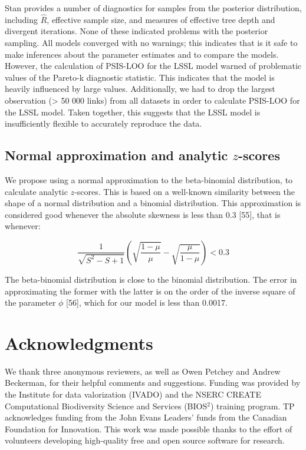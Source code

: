\documentclass[12pt]{article}
\begin{document}
Stan provides a number of diagnostics for samples from the posterior
distribution, including \(\hat{R}\), effective sample size, and measures
of effective tree depth and divergent iterations. None of these
indicated problems with the posterior sampling. All models converged
with no warnings; this indicates that is it safe to make inferences
about the parameter estimates and to compare the models. However, the
calculation of PSIS-LOO for the LSSL model warned of problematic values
of the Pareto-k diagnostic statistic. This indicates that the model is
heavily influenced by large values. Additionally, we had to drop the
largest observation (\textgreater{} 50 000 links) from all datasets in
order to calculate PSIS-LOO for the LSSL model. Taken together, this
suggests that the LSSL model is insufficiently flexible to accurately
reproduce the data.

\hypertarget{normal-approximation-and-analytic-z-scores}{%
\subsection{\texorpdfstring{Normal approximation and analytic
\(z\)-scores}{Normal approximation and analytic z-scores}}\label{normal-approximation-and-analytic-z-scores}}

We propose using a normal approximation to the beta-binomial
distribution, to calculate analytic \(z\)-scores. This is based on a
well-known similarity between the shape of a normal distribution and a
binomial distribution. This approximation is considered good whenever
the absolute skewness is less than 0.3 {[}55{]}, that is whenever:

\[
\frac{1}{\sqrt{S^2 - S + 1}}\left(\sqrt{\frac{1- \mu}{\mu}} - \sqrt{\frac{\mu}{1-\mu}}\right) < 0.3
\]

The beta-binomial distribution is close to the binomial distribution.
The error in approximating the former with the latter is on the order of
the inverse square of the parameter \(\phi\) {[}56{]}, which for our
model is less than 0.0017.

\hypertarget{acknowledgments}{%
\section{Acknowledgments}\label{acknowledgments}}

We thank three anonymous reviewers, as well as Owen Petchey and Andrew
Beckerman, for their helpful comments and suggestions. Funding was
provided by the Institute for data valorization (IVADO) and the NSERC
CREATE Computational Biodiversity Science and Services (BIOS\(^2\))
training program. TP acknowledges funding from the John Evans Leaders'
funds from the Canadian Foundation for Innovation. This work was made
possible thanks to the effort of volunteers developing high-quality free
and open source software for research.
\end{document}
